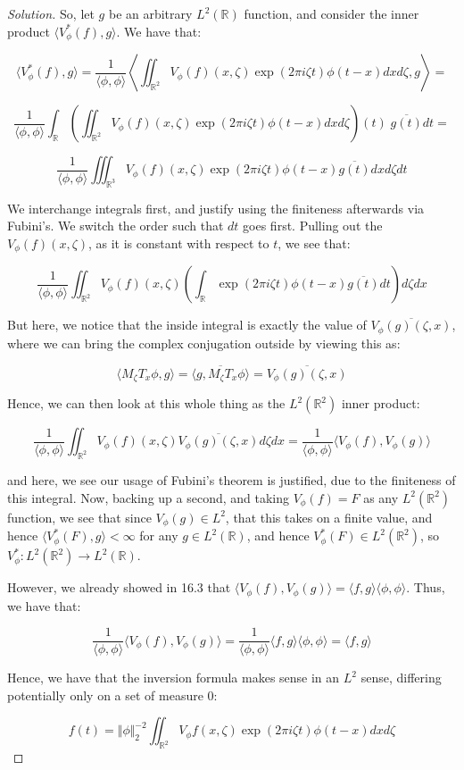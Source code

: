 \documentclass[10pt]{article}
\begin{document}
\begin{proof}[Solution]
So, let $g$ be an arbitrary $L^2(\mathbb{R})$ function, and consider the inner product $\langle V^*_\phi(f), g \rangle$. We have that:

$$ \langle V^*_\phi(f), g \rangle = \frac{1}{ \langle \phi, \phi \rangle } \left\langle \iint_{\mathbb{R}^2} V_\phi(f)(x, \zeta) \exp(2\pi i \zeta t) \phi(t - x) dx d\zeta, g \right\rangle  = $$

$$  \frac{1}{ \langle \phi, \phi \rangle }\int_{\mathbb{R}} \left(\iint_{\mathbb{R}^2} V_\phi(f)(x, \zeta) \exp(2\pi i \zeta t) \phi(t - x) dx d\zeta\right)(t) \; \overline{g(t)} dt  = $$

$$   \frac{1}{ \langle \phi, \phi \rangle } \iiint_{\mathbb{R}^3} V_\phi(f)(x, \zeta) \exp(2\pi i \zeta t )\phi(t - x)\overline{g(t)} dx d\zeta dt $$

We interchange integrals first, and justify using the finiteness afterwards via Fubini's. We switch the order such that $dt$ goes first. Pulling out the $V_\phi(f)(x, \zeta)$, as it is constant with respect to $t$, we see that:

$$  \frac{1}{ \langle \phi, \phi \rangle } \iint_{\mathbb{R}^2} V_\phi(f)(x, \zeta) \left( \int_{\mathbb{R}} \exp(2 \pi i \zeta t) \phi(t - x) \overline{g(t)} dt \right) d\zeta dx $$

But here, we notice that the inside integral is exactly the value of $\overline{V_\phi(g)(\zeta, x)}$, where we can bring the complex conjugation outside by viewing this as:

$$ \langle M_\zeta T_x \phi, g \rangle = \overline{\langle g, M_\zeta T_x \phi \rangle} = \overline{V_\phi(g)(\zeta, x)}$$

Hence, we can then look at this whole thing as the $L^2(\mathbb{R}^2)$ inner product:

$$ \frac{1}{ \langle \phi, \phi \rangle } \iint_{\mathbb{R}^2} V_\phi(f)(x, \zeta) \overline{V_\phi(g)(\zeta, x)} d\zeta dx =  \frac{1}{ \langle \phi, \phi \rangle } \langle V_\phi(f), V_\phi(g) \rangle $$

and here, we see our usage of Fubini's theorem is justified, due to the finiteness of this integral. Now, backing up a second, and taking $V_\phi(f) = F$ as any $L^2(\mathbb{R}^2)$ function, we see that since $V_\phi(g) \in L^2$, that this takes on a finite value, and hence $\langle V^*_\phi(F), g \rangle < \infty$ for any $g \in L^2(\mathbb{R})$, and hence $V^*_\phi(F) \in L^2(\mathbb{R}^2)$, so $V^*_\phi: L^2(\mathbb{R}^2) \to L^2(\mathbb{R})$. 

However, we already showed in 16.3 that $\langle V_\phi(f), V_\phi(g) \rangle = \langle f, g\rangle \langle \phi, \phi \rangle $. Thus, we have that:

$$ \frac{1}{ \langle \phi, \phi \rangle } \langle V_\phi(f), V_\phi(g) \rangle  = \frac{1}{ \langle \phi, \phi \rangle } \langle f, g \rangle \langle \phi, \phi \rangle = \langle f, g \rangle $$

Hence, we have that the inversion formula makes sense in an $L^2$ sense, differing potentially only on a set of measure 0:

$$ f(t) = \Vert \phi \Vert_2^{-2} \iint_{\mathbb{R}^2} V_\phi f(x, \zeta) \exp(2 \pi i \zeta t) \phi(t - x) dx d\zeta $$ 

\end{proof}
\end{document}
